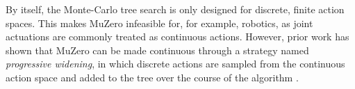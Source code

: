 By itself, the Monte-Carlo tree search is only designed for discrete, finite action spaces. This makes MuZero infeasible for, for example, robotics, as joint actuations are commonly treated as continuous actions. However, prior work has shown that MuZero can be made continuous through a strategy named \textit{progressive widening}, in which discrete actions are sampled from the continuous action space and added to the tree over the course of the algorithm \cite{continuous-muzero}.